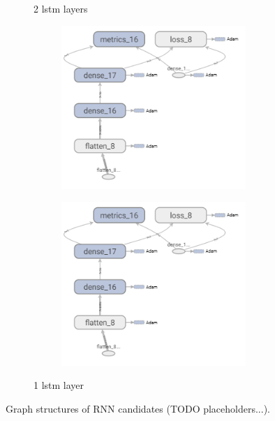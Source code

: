 \begin{figure}
\begin{subfigure}[b]{0.3\linewidth}
\begin{subfigure}[b]{\linewidth}
		\end{subfigure}
		\caption{2 lstm layers}
	\end{subfigure}
	\begin{subfigure}[b]{0.3\linewidth}
		\begin{subfigure}[b]{\linewidth}
			\includegraphics[width=\linewidth]{plots/rnn-candidates-placeholder.png}
		\end{subfigure}
		\begin{subfigure}[b]{\linewidth}
			\includegraphics[width=\linewidth]{plots/rnn-candidates-placeholder.png}
		\end{subfigure}
		\caption{1 lstm layer}
	\end{subfigure}
	\caption{Graph structures of \gls{RNN} candidates (TODO placeholders...).}
	\label{fig:rnn-structure-abstract}
\end{figure}

